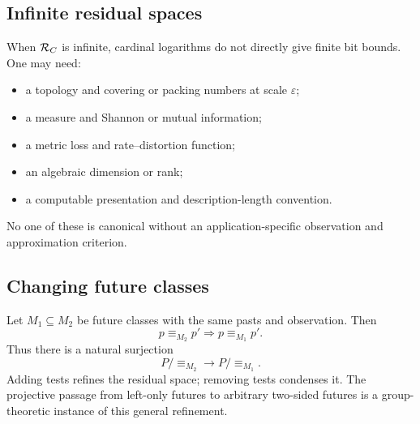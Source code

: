 \subsection{Infinite residual spaces}

When $\mathcal R_C$ is infinite, cardinal logarithms do not directly give finite bit
bounds.  One may need:
\begin{itemize}
  \item a topology and covering or packing numbers at scale $\varepsilon$;
  \item a measure and Shannon or mutual information;
  \item a metric loss and rate--distortion function;
  \item an algebraic dimension or rank;
  \item a computable presentation and description-length convention.
\end{itemize}
No one of these is canonical without an application-specific observation and
approximation criterion.

\subsection{Changing future classes}

Let $M_1\subseteq M_2$ be future classes with the same pasts and observation.
Then
\[
  p\equiv_{M_2}p'
  \Longrightarrow
  p\equiv_{M_1}p'.
\]
Thus there is a natural surjection
\[
  P/{\equiv_{M_2}}\longrightarrow P/{\equiv_{M_1}}.
\]
Adding tests refines the residual space; removing tests condenses it.  The
projective passage from left-only futures to arbitrary two-sided futures is a
group-theoretic instance of this general refinement.
